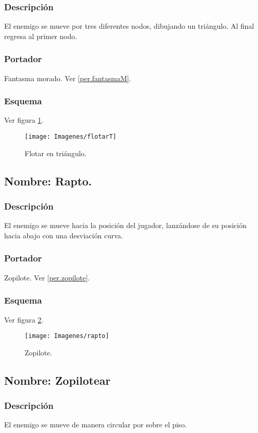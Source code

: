 \documentclass[11pt,letterpaper]{article}
\begin{document}
		\subsubsection{Descripción}
		El enemigo se mueve por tres diferentes nodos, dibujando un triángulo. Al final regresa al primer nodo.
		\subsubsection{Portador}
		Fantasma morado. Ver \ref{per.fantasmaM}.
		\subsubsection{Esquema}
		Ver figura \ref{fig:flotarT}.
		\begin{figure}
			\centering
			\texttt{[image: Imagenes/flotarT]}
			\caption{Flotar en triángulo.}
			\label{fig:flotarT}
		\end{figure}
	\subsection{Nombre: Rapto.} \label{hab.rapto}
		\subsubsection{Descripción}
		El enemigo se mueve hacia la posición del jugador, lanzándose de su posición hacia abajo con una desviación curva.
		\subsubsection{Portador}
		Zopilote. Ver \ref{per.zopilote}.
		\subsubsection{Esquema}
		Ver figura \ref{fig:rapto}.
		\begin{figure}
			\centering
			\texttt{[image: Imagenes/rapto]}
			\caption{Zopilote.}
			\label{fig:rapto}
		\end{figure}
	\subsection{Nombre: Zopilotear} \label{hab.zopilotear}
		\subsubsection{Descripción}
		El enemigo se mueve de manera circular por sobre el piso.
\end{document}
